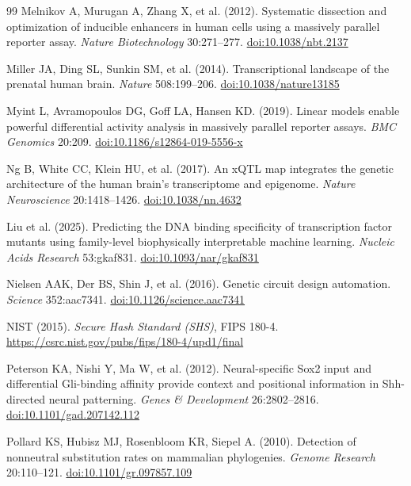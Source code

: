 \begin{thebibliography}{99}
 Melnikov A, Murugan A, Zhang X, et al. (2012). Systematic dissection and optimization of inducible enhancers in human cells using a massively parallel reporter assay. \textit{Nature Biotechnology} 30:271–277. \href{https://doi.org/10.1038/nbt.2137}{doi:10.1038/nbt.2137}

 Miller JA, Ding SL, Sunkin SM, et al. (2014). Transcriptional landscape of the prenatal human brain. \textit{Nature} 508:199–206. \href{https://doi.org/10.1038/nature13185}{doi:10.1038/nature13185}

 Myint L, Avramopoulos DG, Goff LA, Hansen KD. (2019). Linear models enable powerful differential activity analysis in massively parallel reporter assays. \textit{BMC Genomics} 20:209. \href{https://doi.org/10.1186/s12864-019-5556-x}{doi:10.1186/s12864-019-5556-x}

 Ng B, White CC, Klein HU, et al. (2017). An xQTL map integrates the genetic architecture of the human brain's transcriptome and epigenome. \textit{Nature Neuroscience} 20:1418–1426. \href{https://doi.org/10.1038/nn.4632}{doi:10.1038/nn.4632}

 Liu et al. (2025). Predicting the DNA binding specificity of transcription factor mutants using family-level biophysically interpretable machine learning. \textit{Nucleic Acids Research} 53:gkaf831. \href{https://doi.org/10.1093/nar/gkaf831}{doi:10.1093/nar/gkaf831}

 Nielsen AAK, Der BS, Shin J, et al. (2016). Genetic circuit design automation. \textit{Science} 352:aac7341. \href{https://doi.org/10.1126/science.aac7341}{doi:10.1126/science.aac7341}

 NIST (2015). \textit{Secure Hash Standard (SHS)}, FIPS 180-4. \url{https://csrc.nist.gov/pubs/fips/180-4/upd1/final}

 Peterson KA, Nishi Y, Ma W, et al. (2012). Neural-specific Sox2 input and differential Gli-binding affinity provide context and positional information in Shh-directed neural patterning. \textit{Genes \& Development} 26:2802–2816. \href{https://doi.org/10.1101/gad.207142.112}{doi:10.1101/gad.207142.112}

 Pollard KS, Hubisz MJ, Rosenbloom KR, Siepel A. (2010). Detection of nonneutral substitution rates on mammalian phylogenies. \textit{Genome Research} 20:110–121. \href{https://doi.org/10.1101/gr.097857.109}{doi:10.1101/gr.097857.109}


\end{thebibliography}

